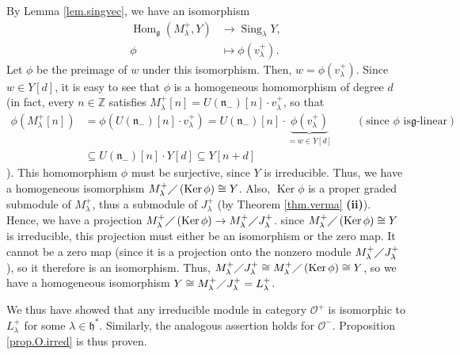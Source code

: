 \documentclass
[numbers=enddot,12pt,final,onecolumn,german,notitlepage]{scrartcl}%
\theoremstyle{definition}
\begin{document}
By Lemma \ref{lem.singvec}, we have an isomorphism%
\begin{align*}
\operatorname*{Hom}\nolimits_{\mathfrak{g}}\left(  M_{\lambda}^{+},Y\right)
&  \rightarrow\operatorname*{Sing}\nolimits_{\lambda}Y,\\
\phi &  \mapsto\phi\left(  v_{\lambda}^{+}\right)  .
\end{align*}
Let $\phi$ be the preimage of $w$ under this isomorphism. Then, $w=\phi\left(
v_{\lambda}^{+}\right)  $. Since $w\in Y\left[  d\right]  $, it is easy to see
that $\phi$ is a homogeneous homomorphism of degree $d$ (in fact, every
$n\in\mathbb{Z}$ satisfies $M_{\lambda}^{+}\left[  n\right]  =U\left(
\mathfrak{n}_{-}\right)  \left[  n\right]  \cdot v_{\lambda}^{+}$, so that%
\begin{align*}
\phi\left(  M_{\lambda}^{+}\left[  n\right]  \right)   &  =\phi\left(
U\left(  \mathfrak{n}_{-}\right)  \left[  n\right]  \cdot v_{\lambda}%
^{+}\right)  =U\left(  \mathfrak{n}_{-}\right)  \left[  n\right]
\cdot\underbrace{\phi\left(  v_{\lambda}^{+}\right)  }_{=w\in Y\left[
d\right]  }\ \ \ \ \ \ \ \ \ \ \left(  \text{since }\phi\text{ is
}\mathfrak{g}\text{-linear}\right) \\
&  \subseteq U\left(  \mathfrak{n}_{-}\right)  \left[  n\right]  \cdot
Y\left[  d\right]  \subseteq Y\left[  n+d\right]
\end{align*}
). This homomorphism $\phi$ must be surjective, since $Y$ is irreducible.
Thus, we have a homogeneous isomorphism $M_{\lambda}^{+}\diagup\left(
\operatorname*{Ker}\phi\right)  \cong Y$. Also, $\operatorname*{Ker}\phi$ is a
proper graded submodule of $M_{\lambda}^{+}$, thus a submodule of $J_{\lambda
}^{+}$ (by Theorem \ref{thm.verma} \textbf{(ii)}). Hence, we have a projection
$M_{\lambda}^{+}\diagup\left(  \operatorname*{Ker}\phi\right)  \rightarrow
M_{\lambda}^{+}\diagup J_{\lambda}^{+}$. since $M_{\lambda}^{+}\diagup\left(
\operatorname*{Ker}\phi\right)  \cong Y$ is irreducible, this projection must
either be an isomorphism or the zero map. It cannot be a zero map (since it is
a projection onto the nonzero module $M_{\lambda}^{+}\diagup J_{\lambda}^{+}%
$), so it therefore is an isomorphism. Thus, $M_{\lambda}^{+}\diagup
J_{\lambda}^{+}\cong M_{\lambda}^{+}\diagup\left(  \operatorname*{Ker}%
\phi\right)  \cong Y$, so we have a homogeneous isomorphism $Y\cong
M_{\lambda}^{+}\diagup J_{\lambda}^{+}=L_{\lambda}^{+}$.

We thus have showed that any irreducible module in category $\mathcal{O}^{+}$
is isomorphic to $L_{\lambda}^{+}$ for some $\lambda\in\mathfrak{h}^{\ast}$.
Similarly, the analogous assertion holds for $\mathcal{O}^{-}$. Proposition
\ref{prop.O.irred} is thus proven.
\end{document}
